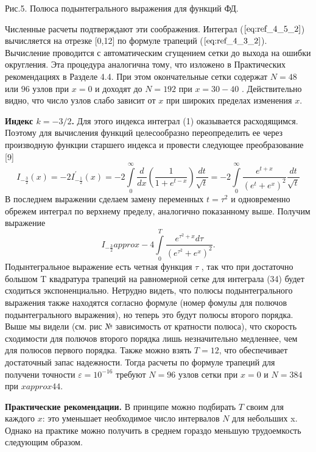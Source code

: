 Рис.5. Полюса подынтегрального выражения для функций ФД.

Численные расчеты подтверждают эти соображения. Интеграл ($\ref{eq:ref_4_5_2}$)
вычисляется на отрезке [0,12] по формуле трапеций ($\ref{eq:ref_4_3_2}$). Вычисление
проводится с автоматическим сгущением сетки до выхода на ошибки
округления. Эта процедура аналогична тому, что изложено в Практических
рекомендациях в Разделе 4.4. При этом окончательные сетки содержат $N = 48$
или $96$ узлов при $x = 0$ и доходят до $N =192$ при $x=30-40$ . Действительно
видно, что число узлов слабо зависит от $x$ при широких пределах изменения $x$.


\textbf{Индекс $k = -3/2$.} Для этого индекса интеграл (1) оказывается
расходящимся. Поэтому для вычисления функций целесообразно
переопределить ее через производную функции старшего индекса и провести
следующее преобразование [9]
\begin{equation}
I_{-\frac{3}{2}}(x) = -2I_{-\frac{1}{2}}^{'}(x) = -2\int\limits_0^{\infty}\frac{d}{dx}(\frac{1}{1+e^{t-x}})\frac{dt}{\sqrt{t}} = -2\int\limits_0^{\infty}\frac{e^{t+x}}{(e^t+e^x)^2} \frac{dt}{\sqrt{t}}
\end{equation}
В последнем выражении сделаем замену переменных $t=\tau^2$ и одновременно
обрежем интеграл по верхнему пределу, аналогично показанному выше.
Получим выражение
\begin{equation}
I_{-\frac{3}{2}} approx -4\int\limits_0^T \frac{e^{\tau^2 + x}d\tau}{(e^{\tau^2}+e^x)^2}.
\end{equation}
Подынтегральное выражение есть четная функция $\tau$ , так что при достаточно
большом T квадратура трапеций на равномерной сетке для интеграла (34)
будет сходиться экспоненциально. Нетрудно видеть, что полюсы подынтегрального выражения также находятся согласно формуле (номер фомулы для полючов подынтегрального выражения), но теперь это будут полюсы второго порядка. Выше мы видели (см. рис № зависимость от кратности полюса), что скорость сходимости для полючов второго порядка лишь незначительно медленнее, чем для полюсов первого порядка. Также можно взять $T = 12$, что обеспечивает достаточный запас надежности. Тогда расчеты по формуле трапеций для получени точности $\varepsilon = 10^{-16}$ требуют $N = 96$ узлов сетки при $x = 0$ и $N = 384$ при $x approx 44$.

\textbf{Практические рекомендации.} В принципе можно подбирать $T$ своим для каждого $x$: это уменьшает необходимое число интервалов $N$ для небольших x. Однако на практике можно получить в среднем гораздо меньшую трудоемкость следующим образом.

